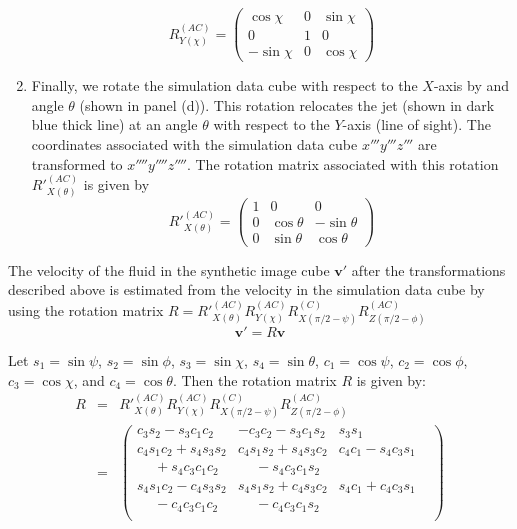 \begin{enumerate}
\begin{equation}
R^{(AC)}_{Y(\chi)} = \begin{pmatrix}
 \cos\chi & 0 & \sin\chi \\
0 & 1  & 0 \\
-\sin\chi & 0 & \cos\chi
\end{pmatrix}  
\end{equation}
\item Finally, we rotate the simulation data cube with respect to the $X$-axis by and angle $\theta$ (shown in panel (d)). This rotation relocates the jet (shown in dark blue thick line) at an angle $\theta$ with respect to the $Y$-axis (line of sight). The coordinates associated with the simulation data cube $x'''y'''z'''$ are transformed to $x''''y''''z''''$. The rotation matrix associated with this rotation $R'^{(AC)}_{X(\theta)}$ is given by
 \begin{equation}
  R'^{(AC)}_{X(\theta)} = \begin{pmatrix}
 1 & 0 & 0 \\
0 & \cos\theta & -\sin\theta \\
0 & \sin\theta & \cos\theta 
\end{pmatrix}  
\end{equation}
\end{enumerate} 

The velocity of the fluid in the synthetic image cube $\textbf{v}'$ after the transformations described above is estimated from the velocity in the simulation data cube by using the rotation matrix $R = R'^{(AC)}_{X(\theta)} R^{(AC)}_{Y(\chi)} R^{(C)}_{X(\pi/2 - \psi)} R^{(AC)}_{Z(\pi/2 - \phi)}$
\begin{equation}
\textbf{v}' = R \textbf{v}
\end{equation}

Let $s_1 = \sin \psi$, $s_2 = \sin \phi$, $s_3 = \sin \chi$, $s_4 = \sin \theta$, $c_1 = \cos \psi$,  $c_2 = \cos \phi$, $c_3 = \cos \chi$, and $c_4 = \cos\theta$. Then the rotation matrix $R$ is given by:
 \begin{eqnarray}
  R &=&  R'^{(AC)}_{X(\theta)} R^{(AC)}_{Y(\chi)} R^{(C)}_{X(\pi/2 - \psi)} R^{(AC)}_{Z(\pi/2 - \phi)} \nonumber \\
  &=&  \begin{pmatrix}
  c_3 s_2 - s_3 c_1 c_2  & -c_3 c_2 -s_3 c_1 s_2 & s_3 s_1 \\[6pt]
  c_4 s_1 c_2 + s_4 s_3 s_2  &  c_4 s_1 s_2 + s_4 s_3 c_2 & c_4 c_1 - s_4 c_3 s_1  \\
\phantom{{}+{}}+ s_4 c_3 c_1 c_2 & \phantom{{}+{}}- s_4 c_3 c_1 s_2  & & \\[6pt]
   s_4 s_1 c_2 - c_4 s_3 s_2 & s_4 s_1 s_2 + c_4 s_3 c_2  &  s_4 c_1 + c_4 c_3 s_1 \\
\phantom{{}+{}} - c_4 c_3 c_1c_2   &\phantom{{}+{}}-c_4 c_3 c_1 s_2  & & \\
\end{pmatrix} \nonumber 
\end{eqnarray}

